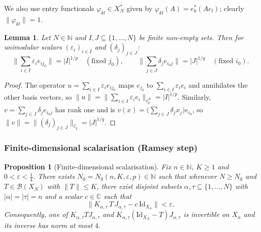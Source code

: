\documentclass[11pt]{amsart}
\theoremstyle{plain}
\newtheorem{lemma}[theorem]{Lemma}
\newtheorem{proposition}[theorem]{Proposition}
\theoremstyle{definition}
\numberwithin{equation}{section}
\newcommand{\norm}[1]{\lVert #1 \rVert}
\newcommand{\Bop}{\mathcal{B}}
\newcommand{\N}{\mathbb{N}}
\newcommand{\C}{\mathbb{C}}
\newcommand{\Id}{\mathrm{Id}}
\renewcommand{\le}{\leqslant}
\renewcommand{\ge}{\geqslant}
\begin{document}
We also use entry functionals $\varphi_{kl}\in X_N^*$ given by $\varphi_{kl}(A)=e_k^*(A e_l)$; clearly $\norm{\varphi_{kl}}=1$.

\begin{lemma}\label{lem:sums-of-matrixunits}
    Let $N\in\N$ and $I,J\subseteq\{1,\dots,N\}$ be finite non-empty sets.
    Then for unimodular scalars $(\varepsilon_i)_{i\in I}$ and $(\delta_j)_{j\in J}$:
    \[
    \norm{\sum_{i\in I}\varepsilon_i e_{ij_0}} = |I|^{1/p} \quad (\text{fixed } j_0),
    \qquad
    \norm{\sum_{j\in J}\delta_j e_{i_0 j}} = |J|^{1/q} \quad (\text{fixed } i_0).
    \]
\end{lemma}

\begin{proof}
The operator $u=\sum_{i\in I}\varepsilon_i e_{i j_0}$ maps $e_{j_0}$ to $\sum_{i\in I}\varepsilon_i e_i$ and annihilates the other basis vectors,
so $\norm{u}=\norm{\sum_{i\in I}\varepsilon_i e_i}_{\ell_p^N}=|I|^{1/p}$.
Similarly, $v=\sum_{j\in J}\delta_j e_{i_0 j}$ has rank one and is $v(x) = \big(\sum_{j\in J}\delta_j x_j\big)e_{i_0}$,
so $\norm{v}=\norm{(\delta_j)_{j\in J}}_{\ell_q}=|J|^{1/q}$.
\end{proof}

\subsubsection{Finite-dimensional scalarisation (Ramsey step)}

\begin{proposition}[Finite-dimensional scalarisation]\label{prop:finite}
Fix $n\in\N$, $K\ge 1$ and $0<\varepsilon<\tfrac14$.
There exists $N_0=N_0(n,K,\varepsilon,p)\in\N$ such that whenever $N\ge N_0$ and $T\in\Bop(X_N)$ with $\norm{T}\le K$,
there exist disjoint subsets $\alpha,\tau\subseteq\{1,\dots,N\}$ with $|\alpha|=|\tau|=n$ and a scalar $c\in\C$ such that
\[
\norm{K_{\alpha,\tau}\,T\,J_{\alpha,\tau}-c\,\Id_{X_n}}<\varepsilon.
\]
Consequently, one of $K_{\alpha,\tau}TJ_{\alpha,\tau}$ and $K_{\alpha,\tau}(\Id_{X_N}-T)J_{\alpha,\tau}$
is invertible on $X_n$ and its inverse has norm at most $4$.
\end{proposition}
\end{document}
